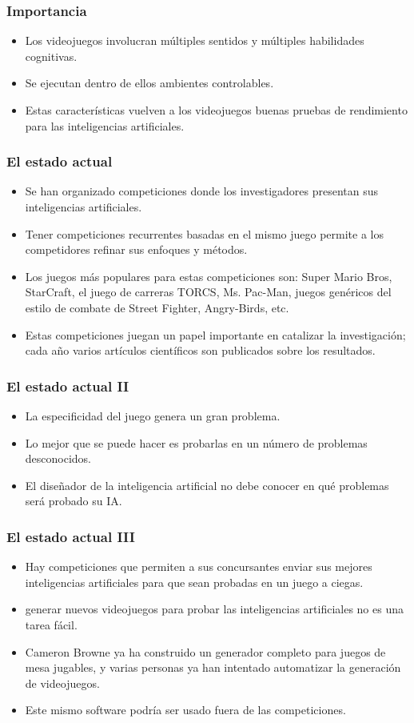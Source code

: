 \documentclass[aspectratio=169]{beamer}
\begin{document}
\begin{frame}
\frametitle{Importancia}
\begin{itemize}[<+->]
\item Los videojuegos involucran múltiples sentidos y múltiples habilidades cognitivas.
\item Se ejecutan dentro de ellos ambientes controlables.
\item Estas características vuelven a los videojuegos buenas pruebas de rendimiento para
  las inteligencias artificiales.
\end{itemize}
\end{frame}

\begin{frame}
\frametitle{El estado actual}
\begin{itemize}[<+->]
\item Se han organizado competiciones donde los investigadores presentan sus
  inteligencias artificiales.
\item Tener competiciones recurrentes basadas en el mismo juego permite a los
  competidores refinar sus enfoques y métodos.
\item Los juegos más populares para estas competiciones son: Super Mario Bros,
  StarCraft, el juego de carreras TORCS,  Ms. Pac-Man, juegos genéricos del estilo
  de combate de Street Fighter, Angry-Birds, etc.
\item Estas competiciones juegan un papel importante en catalizar la investigación;
  cada año varios artículos científicos son publicados sobre los resultados.
\end{itemize}
\end{frame}

\begin{frame}
\frametitle{El estado actual II}
\begin{itemize}[<+->]
\item La especificidad del juego genera un gran problema.
\item Lo mejor que se puede hacer es probarlas en un número de problemas
  desconocidos.
\item El diseñador de la inteligencia artificial no debe conocer en qué
  problemas será probado su IA.
\end{itemize}
\end{frame}

\begin{frame}
\frametitle{El estado actual III}
\begin{itemize}[<+->]
\item Hay competiciones que permiten a sus concursantes enviar sus mejores inteligencias artificiales
  para que sean probadas en un juego a ciegas.
\item generar nuevos videojuegos para probar las inteligencias artificiales no
  es una tarea fácil.
\item Cameron Browne ya ha construido un generador completo para juegos de mesa
  jugables, y varias personas ya han intentado automatizar la generación de
  videojuegos.
\item Este mismo software podría ser usado fuera de las competiciones.
\end{itemize}
\end{frame}
\end{document}
